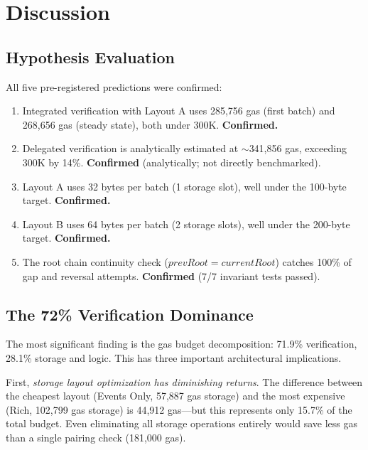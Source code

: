 \section{Discussion}
\label{sec:discussion}

\subsection{Hypothesis Evaluation}

All five pre-registered predictions were confirmed:

\begin{enumerate}
\item[\textbf{P1}] Integrated verification with Layout A uses 285,756 gas (first batch)
and 268,656 gas (steady state), both under 300K. \textbf{Confirmed.}

\item[\textbf{P2}] Delegated verification is analytically estimated at $\sim$341,856 gas,
exceeding 300K by 14\%. \textbf{Confirmed} (analytically; not directly benchmarked).

\item[\textbf{P3}] Layout A uses 32 bytes per batch (1 storage slot), well under the
100-byte target. \textbf{Confirmed.}

\item[\textbf{P4}] Layout B uses 64 bytes per batch (2 storage slots), well under the
200-byte target. \textbf{Confirmed.}

\item[\textbf{P5}] The root chain continuity check ($\mathit{prevRoot} =
\mathit{currentRoot}$) catches 100\% of gap and reversal attempts.
\textbf{Confirmed} (7/7 invariant tests passed).
\end{enumerate}

\subsection{The 72\% Verification Dominance}

The most significant finding is the gas budget decomposition: 71.9\% verification, 28.1\%
storage and logic. This has three important architectural implications.

First, \emph{storage layout optimization has diminishing returns}. The difference between
the cheapest layout (Events Only, 57,887 gas storage) and the most expensive (Rich,
102,799 gas storage) is 44,912 gas---but this represents only 15.7\% of the total budget.
Even eliminating all storage operations entirely would save less gas than a single pairing
check (181,000 gas).


